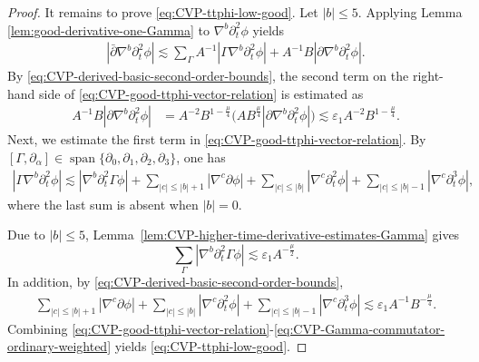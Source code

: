 \documentclass[11pt,twoside]{article}
\def\f{\frac}
\def\p{\partial}
\def\ve{\varepsilon}
\def\ls{\lesssim}
\theoremstyle{plain}
\theoremstyle{definition}
\theoremstyle{assumption}
\numberwithin{equation}{section}
\begin{document}
\begin{proof}
		It remains to prove
		\eqref{eq:CVP-ttphi-low-good}. Let \(|b|\le 5\). Applying Lemma \ref{lem:good-derivative-one-Gamma} to \(\nabla^b\p_t^2\phi\)
yields
		\begin{equation}
			\label{eq:CVP-good-ttphi-vector-relation}
			\begin{aligned}
				|\bar{\p}\nabla^b\p_t^2\phi|
				\ls
				\sum_{\Gamma}
				A^{-1}|\Gamma\nabla^b\p_t^2\phi|
				+
				A^{-1}B|\p\nabla^b\p_t^2\phi|.
			\end{aligned}
		\end{equation}
		By \eqref{eq:CVP-derived-basic-second-order-bounds}, the second term on the right-hand side of \eqref{eq:CVP-good-ttphi-vector-relation}
		is estimated  as
		\begin{equation}
			\label{eq:CVP-good-ttphi-B-term}
			\begin{aligned}
				A^{-1}B|\p\nabla^b\p_t^2\phi|
				&=A^{-2}B^{1-\f\mu4}
				\big(AB^{\f\mu4}|\p\nabla^b\p_t^2\phi|\big)
				\ls
				\ve_1A^{-2}B^{1-\f\mu4}.
			\end{aligned}
		\end{equation}
		Next, we estimate the first term in
		\eqref{eq:CVP-good-ttphi-vector-relation}. By
		$[\Gamma,\p_\alpha]\in
		\operatorname{span}\{\p_0,\p_1,\p_2,\p_3\}$,
		one has
		\begin{equation}
			\label{eq:CVP-Gamma-tt-commutator}
			\begin{aligned}
				|\Gamma\nabla^b\p_t^2\phi|
				\ls
				|\nabla^b\p_t^2\Gamma\phi|
				+
				\sum_{|c|\le |b|+1}
				|\nabla^c\p\phi|
				+
				\sum_{|c|\le |b|}
				|\nabla^c\p_t^2\phi|
				+
				\sum_{|c|\le |b|-1}
				|\nabla^c\p_t^3\phi|,
			\end{aligned}
		\end{equation}
		where the last sum is absent when \(|b|=0\).
		
		Due to \(|b|\le 5\), Lemma~\ref{lem:CVP-higher-time-derivative-estimates-Gamma}
		gives
		\begin{equation}
			\label{eq:CVP-Gamma-main-tt-weighted}
			\sum_{\Gamma}
			|\nabla^b\p_t^2\Gamma\phi|
			\ls
			\ve_1A^{-\frac{\mu}{2}}.
		\end{equation}
		In addition, by \eqref{eq:CVP-derived-basic-second-order-bounds},
		\begin{equation}
			\label{eq:CVP-Gamma-commutator-ordinary-weighted}
			\begin{aligned}
				\sum_{|c|\le |b|+1}
				|\nabla^c\p\phi|
				+
				\sum_{|c|\le |b|}
				|\nabla^c\p_t^2\phi|
				+
				\sum_{|c|\le |b|-1}
				|\nabla^c\p_t^3\phi|
				\ls
				\ve_1A^{-1}B^{-\f\mu 4}.
			\end{aligned}
		\end{equation}
		Combining
		\eqref{eq:CVP-good-ttphi-vector-relation}-\eqref{eq:CVP-Gamma-commutator-ordinary-weighted} yields \eqref{eq:CVP-ttphi-low-good}.
		
	\end{proof}
\end{document}
